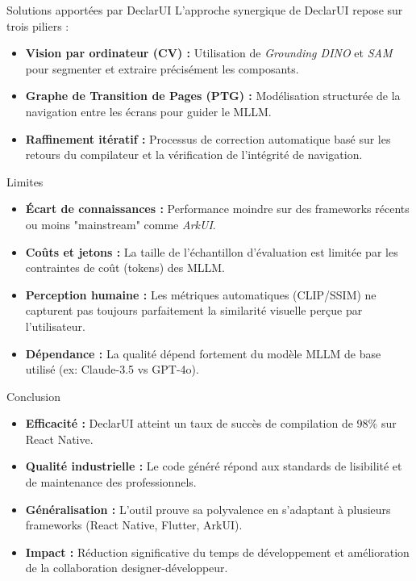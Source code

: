 \documentclass{beamer}
\begin{document}
\begin{frame}{Solutions apportées par DeclarUI}
    L'approche synergique de DeclarUI repose sur trois piliers :
    \begin{itemize}
        \item \textbf{Vision par ordinateur (CV) :} Utilisation de \textit{Grounding DINO} et \textit{SAM} pour segmenter et extraire précisément les composants.
        \item \textbf{Graphe de Transition de Pages (PTG) :} Modélisation structurée de la navigation entre les écrans pour guider le MLLM.
        \item \textbf{Raffinement itératif :} Processus de correction automatique basé sur les retours du compilateur et la vérification de l'intégrité de navigation.
    \end{itemize}
\end{frame}

\begin{frame}{Limites}
    \begin{itemize}
        \item \textbf{Écart de connaissances :} Performance moindre sur des frameworks récents ou moins "mainstream" comme \textit{ArkUI}.
        \item \textbf{Coûts et jetons :} La taille de l'échantillon d'évaluation est limitée par les contraintes de coût (tokens) des MLLM.
        \item \textbf{Perception humaine :} Les métriques automatiques (CLIP/SSIM) ne capturent pas toujours parfaitement la similarité visuelle perçue par l'utilisateur.
        \item \textbf{Dépendance :} La qualité dépend fortement du modèle MLLM de base utilisé (ex: Claude-3.5 vs GPT-4o).
    \end{itemize}
\end{frame}

\begin{frame}{Conclusion}
    \begin{itemize}
        \item \textbf{Efficacité :} DeclarUI atteint un taux de succès de compilation de 98\% sur React Native.
        \item \textbf{Qualité industrielle :} Le code généré répond aux standards de lisibilité et de maintenance des professionnels.
        \item \textbf{Généralisation :} L'outil prouve sa polyvalence en s'adaptant à plusieurs frameworks (React Native, Flutter, ArkUI).
        \item \textbf{Impact :} Réduction significative du temps de développement et amélioration de la collaboration designer-développeur.
    \end{itemize}
\end{frame}
\end{document}
